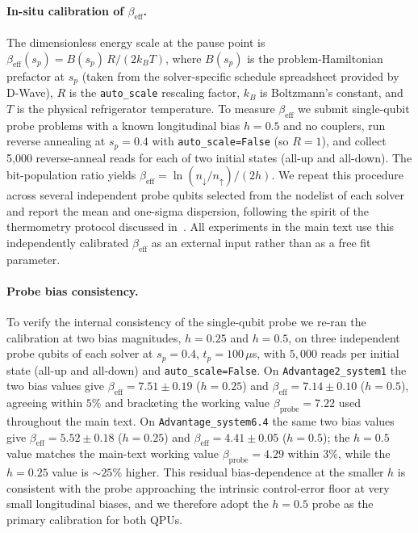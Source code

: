 \documentclass[aps,prapplied,reprint,superscriptaddress,floatfix,nofootinbib]{revtex4-2}
\begin{document}
\paragraph{In-situ calibration of $\beta_\mathrm{eff}$.}
The dimensionless energy scale at the pause point is $\beta_\mathrm{eff}(s_p) = B(s_p)\,R/(2 k_B T)$, where $B(s_p)$ is the problem-Hamiltonian prefactor at $s_p$ (taken from the solver-specific schedule spreadsheet provided by D-Wave), $R$ is the \texttt{auto\_scale} rescaling factor, $k_B$ is Boltzmann's constant, and $T$ is the physical refrigerator temperature.
To measure $\beta_\mathrm{eff}$ we submit single-qubit probe problems with a known longitudinal bias $h=0.5$ and no couplers, run reverse annealing at $s_p=0.4$ with \texttt{auto\_scale=False} (so $R=1$), and collect 5{,}000 reverse-anneal reads for each of two initial states (all-up and all-down).
The bit-population ratio yields $\beta_\mathrm{eff} = \ln(n_\downarrow/n_\uparrow)/(2h)$.
We repeat this procedure across several independent probe qubits selected from the nodelist of each solver and report the mean and one-sigma dispersion, following the spirit of the thermometry protocol discussed in~\cite{grattan2025thermometry}.
All experiments in the main text use this independently calibrated $\beta_\mathrm{eff}$ as an external input rather than as a free fit parameter.

\paragraph{Probe bias consistency.}
To verify the internal consistency of the single-qubit probe we re-ran the calibration at two bias magnitudes, $h=0.25$ and $h=0.5$, on three independent probe qubits of each solver at $s_p=0.4$, $t_p=100\,\mu$s, with $5{,}000$ reads per initial state (all-up and all-down) and \texttt{auto\_scale=False}.
On \texttt{Advantage2\_system1} the two bias values give $\beta_\mathrm{eff}=7.51\pm0.19$ ($h=0.25$) and $\beta_\mathrm{eff}=7.14\pm0.10$ ($h=0.5$), agreeing within $5\%$ and bracketing the working value $\beta_\mathrm{probe}=7.22$ used throughout the main text.
On \texttt{Advantage\_system6.4} the same two bias values give $\beta_\mathrm{eff}=5.52\pm0.18$ ($h=0.25$) and $\beta_\mathrm{eff}=4.41\pm0.05$ ($h=0.5$); the $h=0.5$ value matches the main-text working value $\beta_\mathrm{probe}=4.29$ within $3\%$, while the $h=0.25$ value is $\sim 25\%$ higher.
This residual bias-dependence at the smaller $h$ is consistent with the probe approaching the intrinsic control-error floor at very small longitudinal biases, and we therefore adopt the $h=0.5$ probe as the primary calibration for both QPUs.
\end{document}
